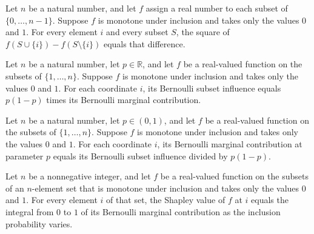 \begin{theorem}
\label{FABL.sq_subsetMarginal_eq_self}
\leanok
{}
Let $n$ be a natural number, and let $f$ assign a real number to each subset of
$\{0,\ldots,n-1\}$. Suppose $f$ is monotone under inclusion and takes only the values
$0$ and $1$. For every element $i$ and every subset $S$, the square of
$f(S\cup\{i\})-f(S\setminus\{i\})$ equals that difference.
\end{theorem}

\begin{theorem}
\label{FABL.bernoulliSubsetInfluence_eq_mul_marginalContribution}
\leanok
{}
Let $n$ be a natural number, let $p\in\mathbb R$, and let $f$ be a real-valued function
on the subsets of $\{1,\ldots,n\}$. Suppose $f$ is monotone under inclusion and takes
only the values $0$ and $1$. For each coordinate $i$, its Bernoulli subset influence
equals $p(1-p)$ times its Bernoulli marginal contribution.
\end{theorem}

\begin{theorem}
\label{FABL.bernoulliMarginalContribution_eq_influence_div}
\leanok
{}
Let $n$ be a natural number, let $p\in(0,1)$, and let $f$ be a real-valued function on
the subsets of $\{1,\ldots,n\}$. Suppose $f$ is monotone under inclusion and takes only
the values $0$ and $1$. For each coordinate $i$, its Bernoulli marginal contribution at
parameter $p$ equals its Bernoulli subset influence divided by $p(1-p)$.
\end{theorem}

\begin{theorem}
\label{FABL.shapleyValue_eq_integral_normalizedInfluence}
\leanok
{}
Let $n$ be a nonnegative integer, and let $f$ be a real-valued function on the subsets
of an $n$-element set that is monotone under inclusion and takes only the values $0$ and
$1$. For every element $i$ of that set, the Shapley value of $f$ at $i$ equals the
integral from $0$ to $1$ of its Bernoulli marginal contribution as the inclusion
probability varies.
\end{theorem}

